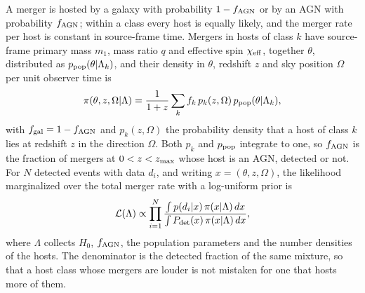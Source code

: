 \documentclass[aps,prd,reprint,twocolumn,superscriptaddress,nofootinbib,floatfix,nolongbibliography]{revtex4-2}
\newcommand{\Lcal}{\mathcal{L}}
\newcommand{\chieff}{\chi_{\rm eff}}
\newcommand{\fagn}{f_{\rm AGN}}
\begin{document}
A merger is hosted by a galaxy with probability $1-\fagn$ or by an AGN with
probability $\fagn$; within a class every host is equally likely, and the
merger rate per host is constant in source-frame time. Mergers in hosts of
class $k$ have source-frame primary mass $m_1$, mass ratio $q$ and effective
spin $\chieff$, together $\theta$, distributed as $p_{\rm
pop}(\theta|\Lambda_k)$, and their density in $\theta$, redshift $z$ and sky
position $\Omega$ per unit observer time is
\begin{equation}
\pi(\theta,z,\Omega|\Lambda)=\frac{1}{1+z}\sum_{k}f_k\,p_k(z,\Omega)\,
p_{\rm pop}(\theta|\Lambda_k) ,
\label{eq:mixture}
\end{equation}
with $f_{\rm gal}=1-\fagn$ and $p_k(z,\Omega)$ the probability density that
a host of class $k$ lies at redshift $z$ in the direction $\Omega$. Both
$p_k$ and $p_{\rm pop}$ integrate to one, so $\fagn$ is the fraction of
mergers at $0<z<z_{\rm max}$ whose host is an AGN, detected or not. For $N$
detected events with data $d_i$, and writing $x=(\theta,z,\Omega)$, the
likelihood marginalized over the total merger rate with a log-uniform prior
is \cite{Mandel:2018mve}
\begin{equation}
\Lcal(\Lambda)\propto\prod_{i=1}^{N}
\frac{\int p(d_i|x)\,\pi(x|\Lambda)\,dx}
{\int P_{\rm det}(x)\,\pi(x|\Lambda)\,dx} ,
\label{eq:like}
\end{equation}
where $\Lambda$ collects $H_0$, $\fagn$, the population parameters and the
number densities of the hosts. The denominator is the
detected fraction of the same mixture, so that a host class whose mergers are
louder is not mistaken for one that hosts more of them.
\end{document}

